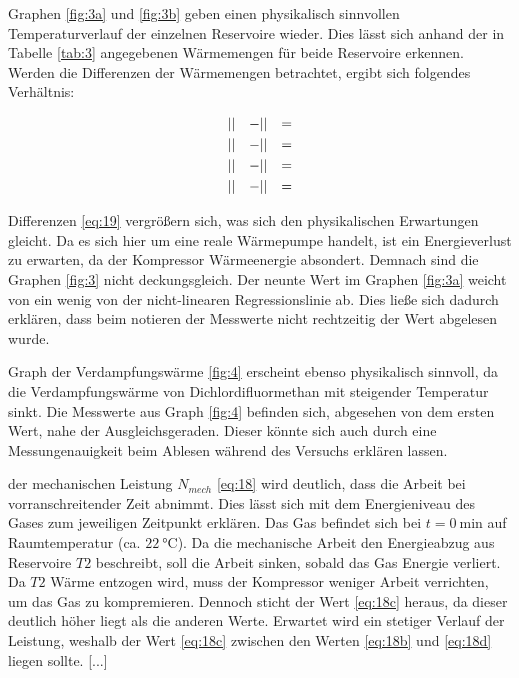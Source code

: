 \justifying Graphen \ref{fig:3a} und \ref{fig:3b} geben einen physikalisch sinnvollen Temperaturverlauf der einzelnen Reservoire 
wieder. Dies lässt sich anhand der in Tabelle \ref{tab:3} angegebenen Wärmemengen für beide Reservoire erkennen. Werden die Differenzen der 
Wärmemengen betrachtet, ergibt sich folgendes Verhältnis:

\begin{subequations} \label{eq:19}
\begin{align}
    &\lvert\text{}\rvert &- &\lvert\text{}\rvert &= &\text{} \label{eq:19a}\\
    &\lvert\text{}\rvert &- &\lvert\text{}\rvert &= &\text{} \label{eq:19b}\\
    &\lvert\text{}\rvert &- &\lvert\text{}\rvert &= &\text{} \label{eq:19c}\\
    &\lvert\text{}\rvert &- &\lvert\text{}\rvert &= &\text{} \label{eq:19d}
\end{align}
\end{subequations}

\justifying Differenzen \eqref{eq:19} vergrößern sich, was sich den physikalischen Erwartungen gleicht. Da es sich hier um 
eine reale Wärmepumpe handelt, ist ein Energieverlust zu erwarten, da der Kompressor Wärmeenergie absondert. Demnach sind die Graphen \ref{fig:3}
nicht deckungsgleich. Der neunte Wert im Graphen \ref{fig:3a} weicht von ein wenig von der nicht-linearen Regressionslinie ab. Dies ließe sich
dadurch erklären, dass beim notieren der Messwerte nicht rechtzeitig der Wert abgelesen wurde. 

\justifying Graph der Verdampfungswärme \ref{fig:4} erscheint ebenso physikalisch sinnvoll, da die Verdampfungswärme von Dichlordifluormethan mit 
steigender Temperatur sinkt. Die Messwerte aus Graph \ref{fig:4} befinden sich, abgesehen von dem ersten Wert, nahe der Ausgleichsgeraden.
Dieser könnte sich auch durch eine Messungenauigkeit beim Ablesen während des Versuchs erklären lassen.

\justifying der mechanischen Leistung $N_{mech}$ \eqref{eq:18} wird deutlich, dass die Arbeit bei vorranschreitender Zeit abnimmt. 
Dies lässt sich mit dem Energieniveau des Gases zum jeweiligen Zeitpunkt erklären. Das Gas befindet sich bei $t = \SI{0}{\minute}$ auf Raumtemperatur
(ca. $\SI{22}{\celsius}$). Da die mechanische Arbeit den Energieabzug aus Reservoire $T2$ beschreibt, soll die Arbeit sinken, sobald das Gas 
Energie verliert. Da $T2$ Wärme entzogen wird, muss der Kompressor weniger Arbeit verrichten, um das Gas zu kompremieren. Dennoch sticht der Wert 
\eqref{eq:18c} heraus, da dieser deutlich höher liegt als die anderen Werte. Erwartet wird ein stetiger Verlauf der Leistung, weshalb der Wert 
\eqref{eq:18c} zwischen den Werten \eqref{eq:18b} und \eqref{eq:18d} liegen sollte. [...]

